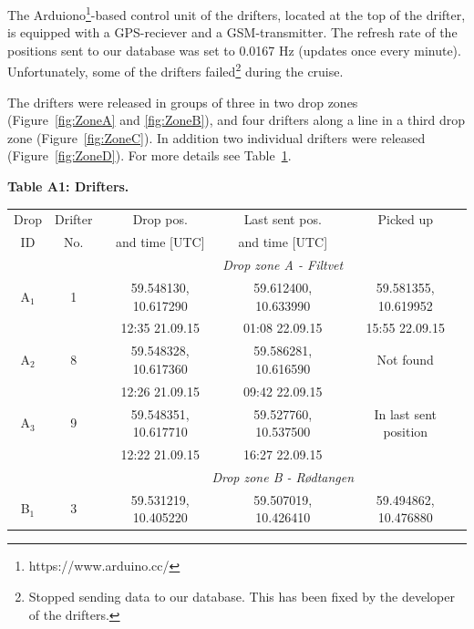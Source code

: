 \documentclass[12pt,a4paper,english]{article}
\begin{document}
The Arduiono\footnote{https://www.arduino.cc/}-based control unit of the drifters, located at the top of the drifter, is equipped with a GPS-reciever and a GSM-transmitter. The refresh rate of the positions sent to our database was set to 0.0167 Hz (updates once every minute). Unfortunately, some of the drifters failed\footnote{Stopped sending data to our database. This has been fixed by the developer of the drifters.} during the cruise.

The drifters were released in groups of three in two drop zones (Figure~\ref{fig:ZoneA} and \ref{fig:ZoneB}), and four drifters along a line in a third drop zone (Figure~\ref{fig:ZoneC}). In addition two individual drifters were released (Figure~\ref{fig:ZoneD}). For more details see Table~\ref{tab:Drifters}.


\begin{table}[tb]
{\bf Table A1: Drifters.}\\
\label{tab:Drifters}
\begin{tabular}{|c|c|ccc|} 
        \hline
        Drop & Drifter & Drop pos.            & Last sent pos.          & Picked up                  \\
        ID  & No.     & and time [UTC]       & and time [UTC]          &                            \\ \hline
             &         &          \multicolumn{3}{c|}{\textit{Drop zone A - Filtvet}}                 \\ 
        A$_1$& 1       & 59.548130, 10.617290 & 59.612400, 10.633990    & 59.581355, 10.619952       \\
             &         & 12:35 21.09.15       & 01:08 22.09.15          & 15:55 22.09.15             \\ 
        A$_2$& 8       & 59.548328, 10.617360 & 59.586281, 10.616590    & Not found                  \\
             &         & 12:26 21.09.15       & 09:42 22.09.15          &                            \\
        A$_3$& 9       & 59.548351, 10.617710 & 59.527760, 10.537500    & In last sent position      \\
             &         & 12:22 21.09.15       & 16:27 22.09.15          &                            \\ \hline 
             &         &          \multicolumn{3}{c|}{\textit{Drop zone B - R\o dtangen}}             \\
        B$_1$& 3       & 59.531219, 10.405220 & 59.507019, 10.426410    & 59.494862, 10.476880       \\

\end{tabular}
\end{table}
\end{document}
